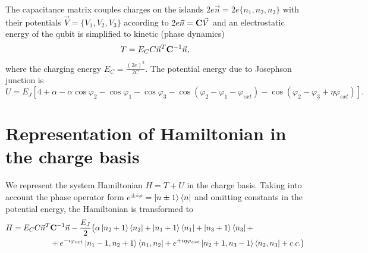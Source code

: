 \documentclass[%
superscriptaddress,
preprint,
preprintnumbers,
bibnotes,
amsmath,
amssymb,
aps,
showkeys,
prb,
]{revtex4-1}
\newcommand{\iabs}[1]{\ensuremath{\left|#1\right|}}
\begin{document}
The capacitance matrix couples charges on the islands $2e\vec{n} = 2e\{ n_1, n_2, n_3\}$ with their potentials $\vec{V} = \{ V_1, V_2, V_3\}$ according to $2e\vec{n} = \bold{C} \vec{V}$ and an electrostatic energy of the qubit is simplified to kinetic (phase dynamics)
\begin{equation}
T= E_C C \vec{n}^T \bold{C}^{-1} \vec{n},
\end{equation}
where the charging energy $E_C = \frac{(2e)^2}{2C}$. The potential energy due to Josephson junction is
\begin{equation}
U = E_J [4 + \alpha - \alpha \cos{\varphi_2} - \cos{\varphi_1} - \cos{\varphi_3} - \cos{(\varphi_2 - \varphi_1 - \varphi_{ext})} - \cos{(\varphi_2 - \varphi_3 + \eta \varphi_{ext})}].
\end{equation}

\section{Representation of Hamiltonian in the charge basis}
\label{sec:repr-hamilt-charge}

We represent the system Hamiltonian $H=T+U$ in the charge basis.
Taking into account the phase operator form $e^{\pm i\varphi} = \ket{n\pm 1}\bra{n}$ and omitting constants in the potential energy, the Hamiltonian is transformed to
\begin{align}
H = E_C C \vec{n}^T &\bold{C}^{-1} \vec{n} -\frac{E_J}{2}\big(\alpha\ket{n_2+1}\bra{n_2}+\ket{n_1+1}\bra{n_1}+ \ket{n_3+1}\bra{n_3} + \nonumber\\
       & + e^{-i\varphi_{ext}}\ket{n_1-1,n_2+1}\bra{n_1,n_2} + e^{+i\eta\varphi_{ext}}\ket{n_2+1,n_3-1}\bra{n_2,n_3} + c.c. \big)
\end{align}


%
%
\end{document}
